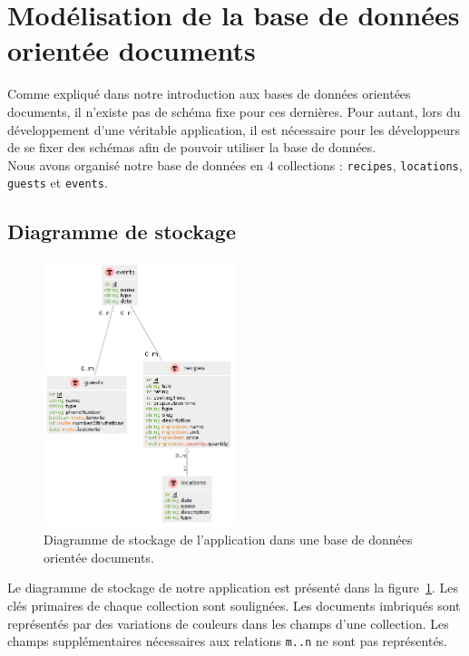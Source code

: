 
\section{Modélisation de la base de données orientée documents}%
\label{sec:modelisation}

	Comme expliqué dans notre introduction aux bases de données orientées documents, il n'existe pas de schéma fixe pour ces dernières. Pour autant, lors du développement d'une véritable application, il est nécessaire pour les développeurs de se fixer des schémas afin de pouvoir utiliser la base de données.\\

	Nous avons organisé notre base de données en 4 collections : \verb|recipes|, \verb|locations|, \verb|guests| et \verb|events|.

	\subsection{Diagramme de stockage}

		\begin{figure}[H]
			\centering
			\includegraphics[width=0.5\textwidth]{images/diagramme-stockage.png}
			\caption{Diagramme de stockage de l'application dans une base de données orientée documents.}
			\label{fig:diagramme-stockage}
		\end{figure}

		Le diagramme de stockage de notre application est présenté dans la figure~\ref{fig:diagramme-stockage}. Les clés primaires de chaque collection sont soulignées. Les documents imbriqués sont représentés par des variations de couleurs dans les champs d'une collection. Les champs supplémentaires nécessaires aux relations \texttt{m..n} ne sont pas représentés.

